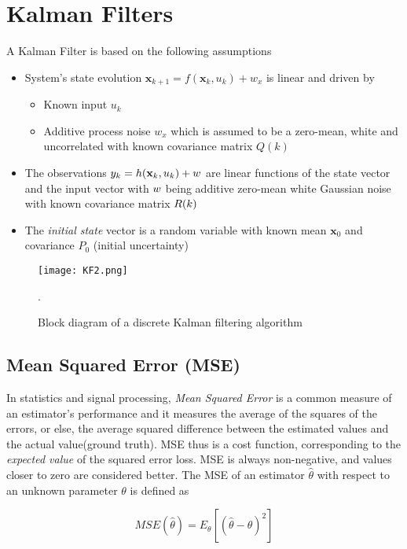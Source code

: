 \section{Kalman Filters} \label{sec:KalmanFilters}
A Kalman Filter is based on the following assumptions
\begin{itemize}
	\item System's state evolution $\mathbf{x}_{k+1} = f(\mathbf{x}_k,u_k) + w_{\textit{x}}$ is linear and driven by
	\begin{itemize}
		\item Known input $u_k$
		\item Additive process noise $w_{\textit{x}}$ which is assumed to be a zero-mean, white and uncorrelated with known covariance matrix $Q(k)$
	\end{itemize}
	\item The observations $ {{y}}_k = h(\mathbf{x}_k,u_k) + {w} $  are linear functions of the state vector and the input vector with ${w}$ being additive zero-mean white Gaussian noise with known covariance matrix ${R}(k)$
	
	\item The \emph{initial state} vector is a random variable with known mean $\mathbf{x}_0$ and covariance $P_0$ (initial uncertainty)
\end{itemize}


\begin{figure}[H]
	\centering
	\texttt{[image: KF2.png]}
	\caption{Block diagram of a discrete Kalman filtering algorithm}.
	\label{fig:state_vector}
\end{figure}

\subsection{Mean Squared Error (MSE)}
In statistics and signal processing, \emph{Mean Squared Error} is a common measure of an estimator's performance and it measures the average of the squares of the errors, or else, the average squared difference between the estimated values and the actual value(ground truth). MSE thus is a cost function, corresponding to the \emph{expected value} of the squared error loss. MSE is always non-negative, and values closer to zero are considered better. The MSE of an estimator $\hat{\theta}$ with respect to an unknown parameter $\theta$ is defined as 

\[ MSE(\hat{\theta}) = E_{\theta}\left[(\hat{\theta}-\theta)^2\right] \]

